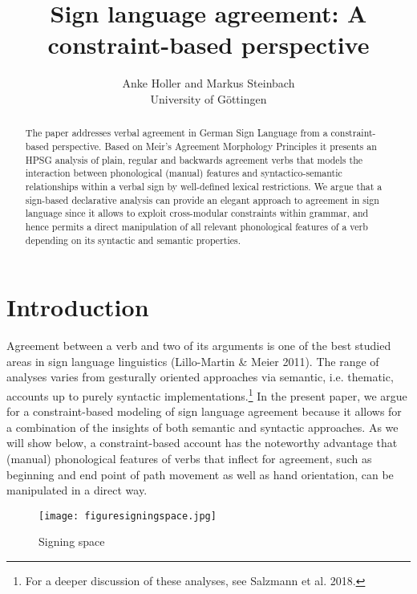 \documentclass[11pt,a4paper,fleqn]{article}
\title{Sign language agreement: A constraint-based perspective}
\author{Anke Holler and Markus Steinbach \\ University of Göttingen}
\begin{document}
\begin{abstract}The paper addresses verbal agreement in German Sign Language from a constraint-based perspective. Based on Meir's Agreement Morphology Principles it presents an HPSG analysis of plain, regular and backwards agreement verbs that models the interaction between phonological (manual) features and syntactico-semantic relationships within a verbal sign by well-defined lexical restrictions. We argue that a sign-based declarative analysis can provide an elegant approach to agreement in sign language since it allows to exploit cross-modular constraints within grammar, and hence permits a direct manipulation of all relevant phonological features of a verb depending on its syntactic and semantic properties.
\end{abstract}

\setcounter{footnote}{2}
\renewcommand{\thefootnote}{\fnsymbol{footnote}}
\renewcommand{\thefootnote}{\arabic{footnote}}
\setcounter{footnote}{0}


\section{Introduction}

Agreement between a verb and two of its arguments is one of the best studied areas in sign language linguistics (Lillo-Martin \& Meier 2011). The range of analyses varies from gesturally oriented approaches via semantic, i.e. thematic, accounts up to purely syntactic implementations.\footnote{For a deeper discussion of these analyses, see Salzmann et al. 2018.} In the present paper, we argue for a constraint-based modeling of sign language agreement because it allows for a combination of the insights of both semantic and syntactic approaches. As we will show below, a constraint-based account has the noteworthy advantage that (manual) phonological features of verbs that inflect for agreement, such as beginning and end point of path movement as well as hand orientation, can be manipulated in a direct way.


\begin{figure}[h]
    \centering
	\texttt{[image: figuresigningspace.jpg]}
    \caption{Signing space} \label{fig:schwan1}
\end{figure}
\end{document}
